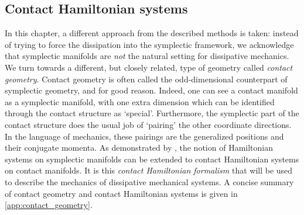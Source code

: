 \subsection{Contact Hamiltonian systems} 
In this chapter, a different approach from the described methods is taken: instead of trying to force the dissipation into the symplectic framework, we acknowledge that symplectic manifolds are \emph{not} the natural setting for dissipative mechanics. We turn towards a different, but closely related, type of geometry called \emph{contact geometry}. Contact geometry is often called the odd-dimensional counterpart of symplectic geometry, and for good reason. Indeed, one can see a contact manifold as a symplectic manifold, with one extra dimension which can be identified through the contact structure as `special'. Furthermore, the symplectic part of the contact structure does the usual job of `pairing' the other coordinate directions. In the language of mechanics, these pairings are the generalized positions and their conjugate momenta. As demonstrated by \citet{Arnold1989}, the notion of Hamiltonian systems on symplectic manifolds can be extended to contact Hamiltonian systems on contact manifolds. It is this \emph{contact Hamiltonian formalism} that will be used to describe the mechanics of dissipative mechanical systems. A concise summary of contact geometry and contact Hamiltonian systems is given in \cref{app:contact_geometry}.

